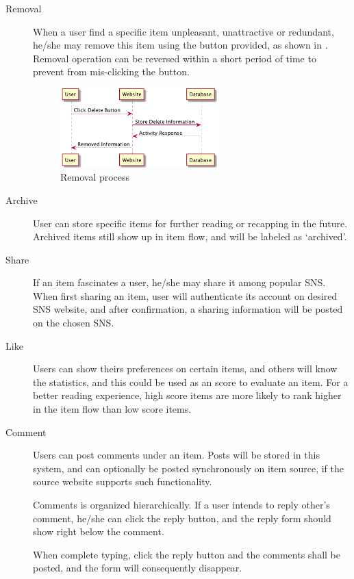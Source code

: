 \begin{description}
\item[Removal] \hfill

  When a user find a specific item unpleasant, unattractive or redundant, he/she
  may remove this item using the button provided, as shown in . Removal operation can be
  reversed within a short period of time to prevent from mis-clicking the button.

\begin{figure}[H]
  \centering
  \includegraphics[width=0.6\textwidth]{img/delete.png}
  \caption{Removal process\label{fig:delete}}
\end{figure}


\item[Archive] \hfill

  User can store specific items for further reading or recapping in
  the future. Archived items still show up in item flow, and will be
  labeled as `archived'.

\item[Share] \hfill

  If an item fascinates a user, he/she may share it among popular SNS.
  When first sharing an item, user will authenticate its account on
  desired SNS website, and after confirmation, a sharing information
  will be posted on the chosen SNS.

\item[Like] \hfill

  Users can show theirs preferences on certain items, and others will
  know the statistics, and this could be used as an score to evaluate an
  item. For a better reading experience, high score items are more likely to rank higher in the item flow than low score items.

\item[Comment] \hfill

  Users can post comments under an item. Posts will be stored in
  this system, and can optionally be posted synchronously on item
  source, if the source website supports such functionality.

  Comments is organized hierarchically. If a user intends to reply
  other's comment, he/she can click the reply button, and the
  reply form should show right below the comment.

  When complete typing, click the reply button and the comments shall be
  posted, and the form will consequently disappear.
\end{description}

